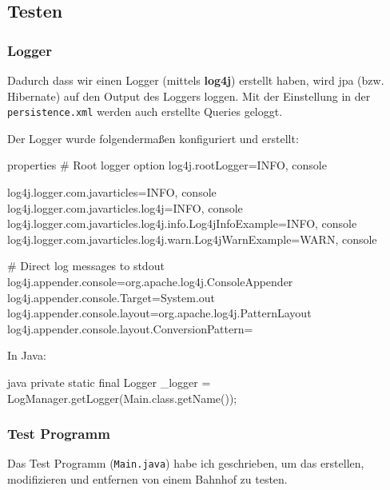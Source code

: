 \clearpage
\subsection{Testen}

\subsubsection{Logger}

Dadurch dass wir einen Logger (mittels \textbf{log4j}) erstellt haben, wird \gls{jpa} (bzw. Hibernate) auf den Output des Loggers loggen. Mit der Einstellung in der \texttt{persistence.xml} werden auch erstellte Queries geloggt.

Der Logger wurde folgendermaßen konfiguriert und erstellt:

\begin{code}{properties}
# Root logger option
log4j.rootLogger=INFO, console

log4j.logger.com.javarticles=INFO, console
log4j.logger.com.javarticles.log4j=INFO, console
log4j.logger.com.javarticles.log4j.info.Log4jInfoExample=INFO, console
log4j.logger.com.javarticles.log4j.warn.Log4jWarnExample=WARN, console

# Direct log messages to stdout
log4j.appender.console=org.apache.log4j.ConsoleAppender
log4j.appender.console.Target=System.out
log4j.appender.console.layout=org.apache.log4j.PatternLayout
log4j.appender.console.layout.ConversionPattern=%
\end{code}

In Java:

\begin{code}{java}
private static final Logger _logger = LogManager.getLogger(Main.class.getName());
\end{code}

\subsubsection{Test Programm}

Das Test Programm (\texttt{Main.java}) habe ich geschrieben, um das erstellen, modifizieren und entfernen von einem Bahnhof zu testen.

